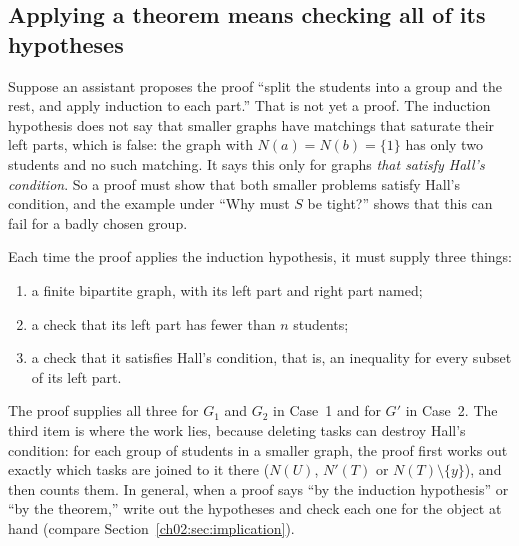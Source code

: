\subsection*{Applying a theorem means checking all of its hypotheses}
Suppose an assistant proposes the proof ``split the students into a group and the rest, and apply induction to each part.'' That is not yet a proof. The induction hypothesis does not say that smaller graphs have matchings that saturate their left parts, which is false: the graph with $N(a)=N(b)=\{1\}$ has only two students and no such matching. It says this only for graphs \emph{that satisfy Hall's condition}. So a proof must show that both smaller problems satisfy Hall's condition, and the example under ``Why must $S$ be tight?'' shows that this can fail for a badly chosen group.

Each time the proof applies the induction hypothesis, it must supply three things:
\begin{enumerate}
\item a finite bipartite graph, with its left part and right part named;
\item a check that its left part has fewer than $n$ students;
\item a check that it satisfies Hall's condition, that is, an inequality for every subset of its left part.
\end{enumerate}
The proof supplies all three for $G_1$ and $G_2$ in Case~1 and for $G'$ in Case~2. The third item is where the work lies, because deleting tasks can destroy Hall's condition: for each group of students in a smaller graph, the proof first works out exactly which tasks are joined to it there ($N(U)$, $N'(T)$ or $N(T)\setminus\{y\}$), and then counts them. In general, when a proof says ``by the induction hypothesis'' or ``by the theorem,'' write out the hypotheses and check each one for the object at hand (compare Section~\ref{ch02:sec:implication}).
